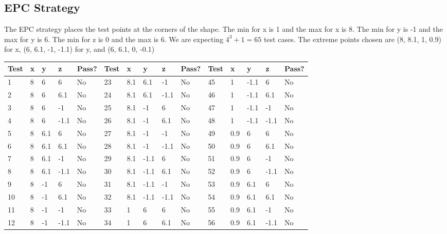 \documentclass[12pt, letterpaper, titlepage]{article}
\begin{document}
\subsection*{EPC Strategy}
The EPC strategy places the test points at the corners of the shape. The min for x is 1 and the max for x is 8. The min for y is -1 and the max for y is 6. The min for z is 0 and the max is 6. We are expecting $4^3 + 1 = 65$ test cases. The extreme points chosen are (8, 8.1, 1, 0.9) for x, (6, 6.1, -1, -1.1) for y, and (6, 6.1, 0, -0.1) \\
    \begin{tabular}{|l|l|l|l|l|l|l|l|l|l|l|l|l|l|l|}
    \hline
    Test & x   & y    & z    & Pass? & Test & x   & y    & z    & Pass? & Test & x   & y    & z    & Pass? \\ \hline
    1    & 8   & 6    & 6    & No       & 23   & 8.1 & 6.1  & -1   & No    & 45   & 1   & -1.1 & 6    & No    \\ \hline
    2    & 8   & 6    & 6.1  & No       & 24   & 8.1 & 6.1  & -1.1 & No    & 46   & 1   & -1.1 & 6.1  & No    \\ \hline
    3    & 8   & 6    & -1   & No       & 25   & 8.1 & -1   & 6    & No    & 47   & 1   & -1.1 & -1   & No    \\ \hline
    4    & 8   & 6    & -1.1 & No       & 26   & 8.1 & -1   & 6.1  & No    & 48   & 1   & -1.1 & -1.1 & No    \\ \hline
    5    & 8   & 6.1  & 6    & No       & 27   & 8.1 & -1   & -1   & No    & 49   & 0.9 & 6    & 6    & No    \\ \hline
    6    & 8   & 6.1  & 6.1  & No       & 28   & 8.1 & -1   & -1.1 & No    & 50   & 0.9 & 6    & 6.1  & No    \\ \hline
    7    & 8   & 6.1  & -1   & No       & 29   & 8.1 & -1.1 & 6    & No    & 51   & 0.9 & 6    & -1   & No    \\ \hline
    8    & 8   & 6.1  & -1.1 & No       & 30   & 8.1 & -1.1 & 6.1  & No    & 52   & 0.9 & 6    & -1.1 & No    \\ \hline
    9    & 8   & -1   & 6    & No       & 31   & 8.1 & -1.1 & -1   & No    & 53   & 0.9 & 6.1  & 6    & No    \\ \hline
    10   & 8   & -1   & 6.1  & No       & 32   & 8.1 & -1.1 & -1.1 & No    & 54   & 0.9 & 6.1  & 6.1  & No    \\ \hline
    11   & 8   & -1   & -1   & No       & 33   & 1   & 6    & 6    & No    & 55   & 0.9 & 6.1  & -1   & No    \\ \hline
    12   & 8   & -1   & -1.1 & No       & 34   & 1   & 6    & 6.1  & No    & 56   & 0.9 & 6.1  & -1.1 & No    \\ \hline

\end{tabular}
\end{document}
